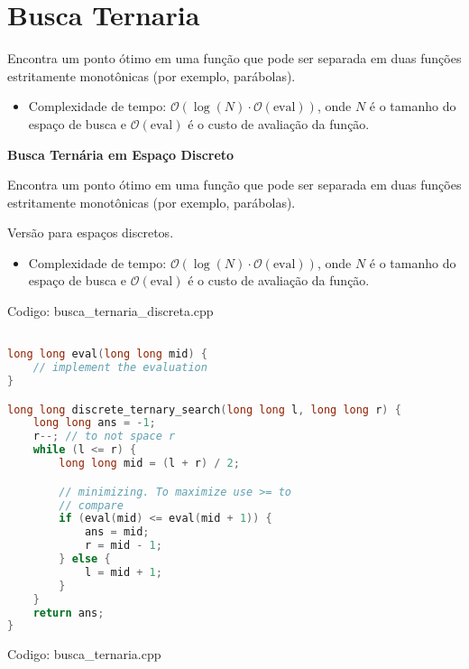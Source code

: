\documentclass[10pt, a4paper, oneside]{book}
\begin{document}
\section{Busca Ternaria}


Encontra um ponto ótimo em uma função que pode ser separada em duas funções estritamente monotônicas (por exemplo, parábolas).



\begin{itemize}
\item Complexidade de tempo: $\mathcal{O}(\log(N) \cdot \mathcal{O}(\text{eval}))$, onde \(N\) é o tamanho do espaço de busca e \(\mathcal{O}(\text{eval})\) é o custo de avaliação da função.
\end{itemize}



\textbf{Busca Ternária em Espaço Discreto} 



Encontra um ponto ótimo em uma função que pode ser separada em duas funções estritamente monotônicas (por exemplo, parábolas).

Versão para espaços discretos.



\begin{itemize}
\item Complexidade de tempo: $\mathcal{O}(\log(N) \cdot \mathcal{O}(\text{eval}))$, onde \(N\) é o tamanho do espaço de busca e \(\mathcal{O}(\text{eval})\) é o custo de avaliação da função.
\end{itemize}

\hfill

Codigo: busca\_ternaria\_discreta.cpp

\begin{lstlisting}[language=C++]

long long eval(long long mid) {
    // implement the evaluation
}

long long discrete_ternary_search(long long l, long long r) {
    long long ans = -1;
    r--; // to not space r
    while (l <= r) {
        long long mid = (l + r) / 2;

        // minimizing. To maximize use >= to
        // compare
        if (eval(mid) <= eval(mid + 1)) {
            ans = mid;
            r = mid - 1;
        } else {
            l = mid + 1;
        }
    }
    return ans;
}
\end{lstlisting}
\hfill

Codigo: busca\_ternaria.cpp
\end{document}
